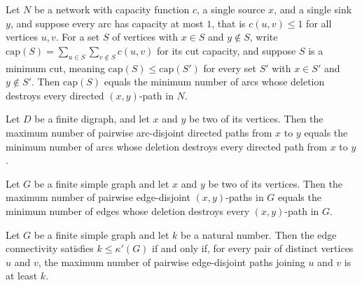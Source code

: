 \begin{theorem}
\label{Networks.unitCapacity_minCut_eq_minDestroying}
Let $N$ be a network with capacity function $c$, a single source $x$, and a single sink
$y$, and suppose every arc has capacity at most $1$, that is $c(u,v) \le 1$ for all
vertices $u,v$. For a set $S$ of vertices with $x \in S$ and $y \notin S$, write
$\mathrm{cap}(S) = \sum_{u \in S}\sum_{v \notin S} c(u,v)$ for its cut capacity, and
suppose $S$ is a minimum cut, meaning $\mathrm{cap}(S) \le \mathrm{cap}(S')$ for every
set $S'$ with $x \in S'$ and $y \notin S'$. Then $\mathrm{cap}(S)$ equals the minimum
number of arcs whose deletion destroys every directed $(x,y)$-path in $N$.
\end{theorem}

\begin{theorem}
\label{Networks.menger_arc_digraph}
Let $D$ be a finite digraph, and let $x$ and $y$ be two of its vertices. Then the
maximum number of pairwise arc-disjoint directed paths from $x$ to $y$ equals the
minimum number of arcs whose deletion destroys every directed path from $x$ to $y$.
\end{theorem}

\begin{theorem}
\label{Networks.menger_edge_graph}
Let $G$ be a finite simple graph and let $x$ and $y$ be two of its vertices. Then the
maximum number of pairwise edge-disjoint $(x,y)$-paths in $G$ equals the minimum number
of edges whose deletion destroys every $(x,y)$-path in $G$.
\end{theorem}

\begin{theorem}
\label{Networks.k_edge_connected_iff_edge_disjoint_paths}
Let $G$ be a finite simple graph and let $k$ be a natural number. Then the edge
connectivity satisfies $k \le \kappa'(G)$ if and only if, for every pair of distinct
vertices $u$ and $v$, the maximum number of pairwise edge-disjoint paths joining $u$ and
$v$ is at least $k$.
\end{theorem}

